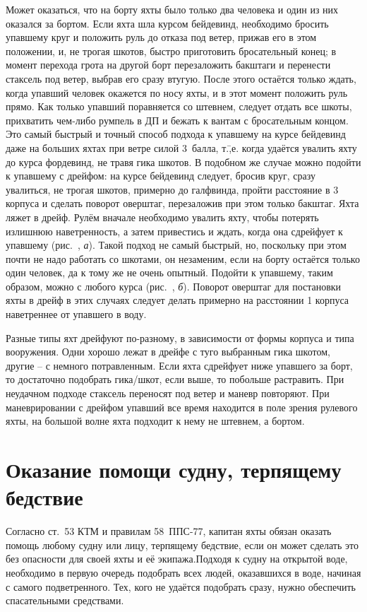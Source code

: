 Может оказаться, что на борту яхты было только два человека и один из
них оказался за бортом. Если яхта шла курсом бейдевинд, необходимо
бросить упавшему круг и положить руль до отказа под ветер, прижав его
в этом положении, и, не трогая шкотов, быстро приготовить бросательный
конец; в момент перехода грота на другой борт перезаложить бакштаги и
перенести стаксель под ветер, выбрав его сразу втугую. После этого
остаётся только ждать, когда упавший человек окажется по носу яхты, и
в этот момент положить руль прямо. Как только упавший поравняется со
штевнем, следует отдать все шкоты, прихватить чем-либо румпель в ДП и
бежать к вантам с бросательным концом. Это самый быстрый и точный
способ подхода к упавшему на курсе бейдевинд даже на больших яхтах при
ветре силой 3~балла, т.\=,е. когда удаётся увалить яхту до
курса фордевинд, не травя гика шкотов. В подобном же случае можно
подойти к упавшему с дрейфом: на курсе бейдевинд следует, бросив круг,
сразу увалиться, не трогая шкотов, примерно до галфвинда, пройти
расстояние в 3 корпуса и сделать поворот оверштаг, перезаложив
при этом только бакштаг. Яхта ляжет в дрейф. Рулём вначале необходимо
увалить яхту, чтобы потерять излишнюю наветренность, а затем
привестись и ждать, когда она сдрейфует к упавшему (рис.~,
\textit{а}). Такой подход не самый быстрый, но, поскольку при этом
почти не надо работать со шкотами, он незаменим, если на борту
остаётся только один человек, да к тому же не очень опытный. Подойти к
упавшему, таким образом, можно с любого курса (рис.~,
\textit{б}). Поворот оверштаг для постановки яхты в дрейф в этих
случаях следует делать примерно на расстоянии 1 корпуса наветреннее от
упавшего в воду.

Разные типы яхт дрейфуют по-разному, в зависимости от формы корпуса и
типа вооружения. Одни хорошо лежат в дрейфе с туго выбранным гика
шкотом, другие \--- с немного потравленным. Если яхта сдрейфует ниже
упавшего за борт, то достаточно подобрать гика\-/шкот, если выше, то
побольше растравить. При неудачном подходе стаксель переносят под
ветер и маневр повторяют. При маневрировании с дрейфом упавший все
время находится в поле зрения рулевого яхты, на большой волне яхта
подходит к нему не штевнем, а бортом.

\section{Оказание помощи судну, терпящему бедствие}

Согласно ст.~53 КТМ и правилам 58~ППС-77, капитан яхты обязан оказать
помощь любому судну или лицу, терпящему бедствие, если он может
сделать это без опасности для своей яхты и её экипажа.Подходя к судну
на открытой воде, необходимо в первую очередь подобрать всех людей,
оказавшихся в воде, начиная с самого подветренного. Тех, кого не
удаётся подобрать сразу, нужно обеспечить спасательными средствами.

